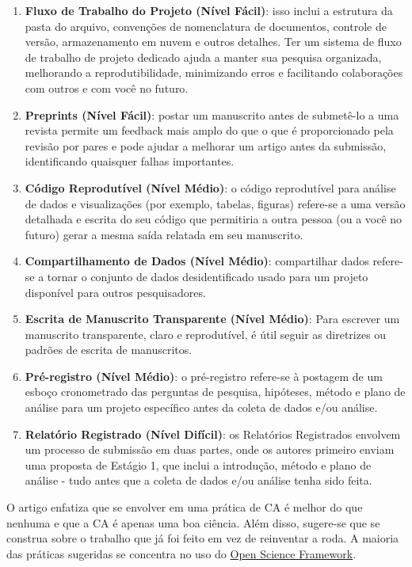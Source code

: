 \documentclass[
  a4paper,
]{article}
\begin{document}
\begin{tcolorbox}
\begin{enumerate}
\def\labelenumi{\arabic{enumi}.}
\item
  \textbf{Fluxo de Trabalho do Projeto (Nível Fácil)}: isso inclui a
  estrutura da pasta do arquivo, convenções de nomenclatura de
  documentos, controle de versão, armazenamento em nuvem e outros
  detalhes. Ter um sistema de fluxo de trabalho de projeto dedicado
  ajuda a manter sua pesquisa organizada, melhorando a
  reprodutibilidade, minimizando erros e facilitando colaborações com
  outros e com você no futuro.
\item
  \textbf{Preprints (Nível Fácil)}: postar um manuscrito antes de
  submetê-lo a uma revista permite um feedback mais amplo do que o que é
  proporcionado pela revisão por pares e pode ajudar a melhorar um
  artigo antes da submissão, identificando quaisquer falhas importantes.
\item
  \textbf{Código Reprodutível (Nível Médio)}: o código reprodutível para
  análise de dados e visualizações (por exemplo, tabelas, figuras)
  refere-se a uma versão detalhada e escrita do seu código que
  permitiria a outra pessoa (ou a você no futuro) gerar a mesma saída
  relatada em seu manuscrito.
\item
  \textbf{Compartilhamento de Dados (Nível Médio)}: compartilhar dados
  refere-se a tornar o conjunto de dados desidentificado usado para um
  projeto disponível para outros pesquisadores.
\item
  \textbf{Escrita de Manuscrito Transparente (Nível Médio)}: Para
  escrever um manuscrito transparente, claro e reprodutível, é útil
  seguir as diretrizes ou padrões de escrita de manuscritos.
\item
  \textbf{Pré-registro (Nível Médio)}: o pré-registro refere-se à
  postagem de um esboço cronometrado das perguntas de pesquisa,
  hipóteses, método e plano de análise para um projeto específico antes
  da coleta de dados e/ou análise.
\item
  \textbf{Relatório Registrado (Nível Difícil)}: os Relatórios
  Registrados envolvem um processo de submissão em duas partes, onde os
  autores primeiro enviam uma proposta de Estágio 1, que inclui a
  introdução, método e plano de análise - tudo antes que a coleta de
  dados e/ou análise tenha sido feita.
\end{enumerate}

O artigo enfatiza que se envolver em uma prática de CA é melhor do que
nenhuma e que a CA é apenas uma boa ciência. Além disso, sugere-se que
se construa sobre o trabalho que já foi feito em vez de reinventar a
roda. A maioria das práticas sugeridas se concentra no uso do
\href{https://osf.io}{Open Science Framework}.

\end{tcolorbox}
\end{document}
